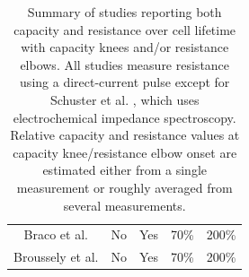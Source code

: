 \documentclass[journal=jpclcd,manuscript=article]{achemso}
\begin{document}
\begin{table}[!ht]
\begin{tabular}{|c||c|c|c|c|}
        Braco et al.\cite{braco_experimental_2020} & No & Yes & 70\% & 200\% \\
        Broussely et al.\cite{broussely_main_2005} & No & Yes & 70\% & 200\% \\
        \hline
    \end{tabular}
    \caption{Summary of studies reporting both capacity and resistance over cell lifetime with capacity knees and/or resistance elbows. All studies measure resistance using a direct-current pulse except for Schuster et al. \cite{schuster_nonlinear_2015}{}, which uses electrochemical impedance spectroscopy. Relative capacity and resistance values at capacity knee/resistance elbow onset are estimated either from a single measurement or roughly averaged from several measurements.}
    \label{tab:dcr_growth_papers}
\end{table}


\end{document}
